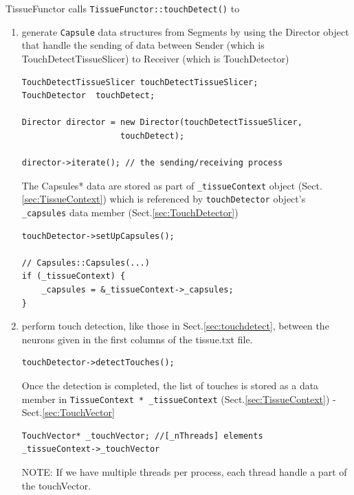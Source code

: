 TissueFunctor calls \verb!TissueFunctor::touchDetect()!  to
\begin{enumerate}
  \item generate \verb!Capsule! data structures from Segments by using the
  Director object that handle the sending of data
  between Sender (which is TouchDetectTissueSlicer) to Receiver (which is
  TouchDetector)
\begin{verbatim}
TouchDetectTissueSlicer touchDetectTissueSlicer;
TouchDetector  touchDetect;

Director director = new Director(touchDetectTissueSlicer,
                    touchDetect);                    

director->iterate(); // the sending/receiving process
\end{verbatim}
  
The Capsules* data are stored as part of \verb!_tissueContext! object
(Sect.\ref{sec:TissueContext}) which is referenced by \verb!touchDetector!
object's \verb!_capsules! data member (Sect.\ref{sec:TouchDetector})

\begin{verbatim}
touchDetector->setUpCapsules();

// Capsules::Capsules(...)
if (_tissueContext) {
    _capsules = &_tissueContext->_capsules;   
}
\end{verbatim}

  \item perform touch detection, like those in
  Sect.\ref{sec:touchdetect}, between the neurons given in the first columns of
  the tissue.txt file.

\begin{verbatim}
touchDetector->detectTouches();
\end{verbatim}

Once the detection is completed, the list of touches is stored as a data member
in \verb!TissueContext * _tissueContext! (Sect.\ref{sec:TissueContext}) -
Sect.\ref{sec:TouchVector}
\begin{lstlisting}
TouchVector* _touchVector; //[_nThreads] elements
_tissueContext->_touchVector
\end{lstlisting}
NOTE: If we have multiple threads per process, each thread handle a part of the
touchVector.

\end{enumerate}

